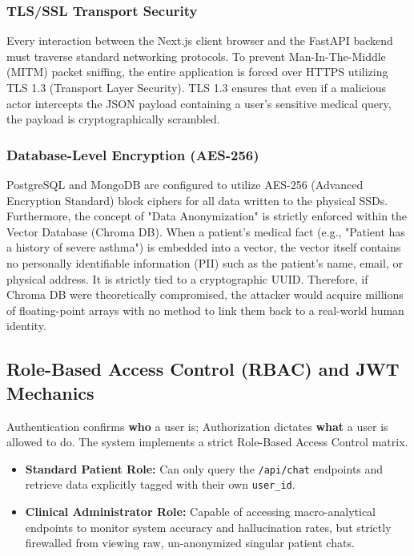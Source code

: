 \documentclass[12pt]{article}
\begin{document}
\subsubsection{TLS/SSL Transport Security}
Every interaction between the Next.js client browser and the FastAPI backend must traverse standard networking protocols. To prevent Man-In-The-Middle (MITM) packet sniffing, the entire application is forced over HTTPS utilizing TLS 1.3 (Transport Layer Security). TLS 1.3 ensures that even if a malicious actor intercepts the JSON payload containing a user's sensitive medical query, the payload is cryptographically scrambled.

\subsubsection{Database-Level Encryption (AES-256)}
PostgreSQL and MongoDB are configured to utilize AES-256 (Advanced Encryption Standard) block ciphers for all data written to the physical SSDs. 
Furthermore, the concept of "Data Anonymization" is strictly enforced within the Vector Database (Chroma DB). When a patient's medical fact (e.g., "Patient has a history of severe asthma") is embedded into a vector, the vector itself contains no personally identifiable information (PII) such as the patient's name, email, or physical address. It is strictly tied to a cryptographic UUID. Therefore, if Chroma DB were theoretically compromised, the attacker would acquire millions of floating-point arrays with no method to link them back to a real-world human identity.

\subsection{Role-Based Access Control (RBAC) and JWT Mechanics}
Authentication confirms \textbf{who} a user is; Authorization dictates \textbf{what} a user is allowed to do. The system implements a strict Role-Based Access Control matrix.
\begin{itemize}
    \item \textbf{Standard Patient Role:} Can only query the \texttt{/api/chat} endpoints and retrieve data explicitly tagged with their own \texttt{user\_id}.
    \item \textbf{Clinical Administrator Role:} Capable of accessing macro-analytical endpoints to monitor system accuracy and hallucination rates, but strictly firewalled from viewing raw, un-anonymized singular patient chats.
\end{itemize}
\end{document}
